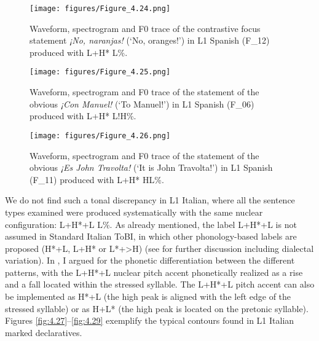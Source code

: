 \begin{figure}


\texttt{[image: figures/Figure\_4.24.png]}


\caption{Waveform, spectrogram and F0 trace of the contrastive focus statement \textit{¡No, naranjas!} (‘No, oranges!’) in L1 Spanish \mbox{(F\_12)} produced with L+H* L\%.}
\label{fig:4.24}
\end{figure}

\begin{figure}


\texttt{[image: figures/Figure\_4.25.png]}


\caption{Waveform, spectrogram and F0 trace of the statement of the obvious \textit{¡Con Manuel!} (‘To Manuel!’) in L1 Spanish \mbox{(F\_06)} produced with L+H* L!H\%.}
\label{fig:4.25}
\end{figure}

\begin{figure}


\texttt{[image: figures/Figure\_4.26.png]}


\caption{Waveform, spectrogram and F0 trace of the statement of the obvious \textit{¡Es John Travolta!} (‘It is John Travolta!’) in L1 Spanish \mbox{(F\_11)} produced with L+H* HL\%.}
\label{fig:4.26}
\end{figure}

We do not find such a tonal discrepancy in L1 Italian, where all the sentence types examined were produced systematically with the same nuclear configuration: L+H*+L L\%. As already mentioned, the label L+H*+L is not assumed in Standard Italian ToBI, in which other phonology-based labels are proposed (H*+L, L+H* or L*+>H) (see \citealt{GiliFivelaEtAl2015} for further discussion including dialectal variation). In , I argued for the phonetic differentiation between the different patterns, with the L+H*+L nuclear pitch accent phonetically realized as a rise and a fall located within the stressed syllable. The L+H*+L pitch accent can also be implemented as H*+L (the high peak is aligned with the left edge of the stressed syllable) or as H+L* (the high peak is located on the pretonic syllable). Figures \ref{fig:4.27}--\ref{fig:4.29} exemplify the typical contours found in L1 Italian marked declaratives.

